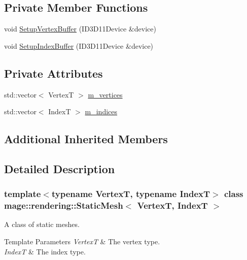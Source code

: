 \subsection*{Private Member Functions}
\begin{DoxyCompactItemize}
\item 
void \hyperlink{classmage_1_1rendering_1_1_static_mesh_a3769fb5361fb09e727748c281c39a824}{Setup\+Vertex\+Buffer} (I\+D3\+D11\+Device \&device)
\item 
void \hyperlink{classmage_1_1rendering_1_1_static_mesh_acd815df7e87dde687613e3f4d5acc564}{Setup\+Index\+Buffer} (I\+D3\+D11\+Device \&device)
\end{DoxyCompactItemize}
\subsection*{Private Attributes}
\begin{DoxyCompactItemize}
\item 
std\+::vector$<$ VertexT $>$ \hyperlink{classmage_1_1rendering_1_1_static_mesh_ae34755a64d965a9e8c5d32c0c2371424}{m\+\_\+vertices}
\item 
std\+::vector$<$ IndexT $>$ \hyperlink{classmage_1_1rendering_1_1_static_mesh_a917240e2f91db85a7f03e8cca766fb26}{m\+\_\+indices}
\end{DoxyCompactItemize}
\subsection*{Additional Inherited Members}


\subsection{Detailed Description}
\subsubsection*{template$<$typename VertexT, typename IndexT$>$\newline
class mage\+::rendering\+::\+Static\+Mesh$<$ Vertex\+T, Index\+T $>$}

A class of static meshes.


\begin{DoxyTemplParams}{Template Parameters}
{\em VertexT} & The vertex type. \\
\hline
{\em IndexT} & The index type. \\
\hline
\end{DoxyTemplParams}


